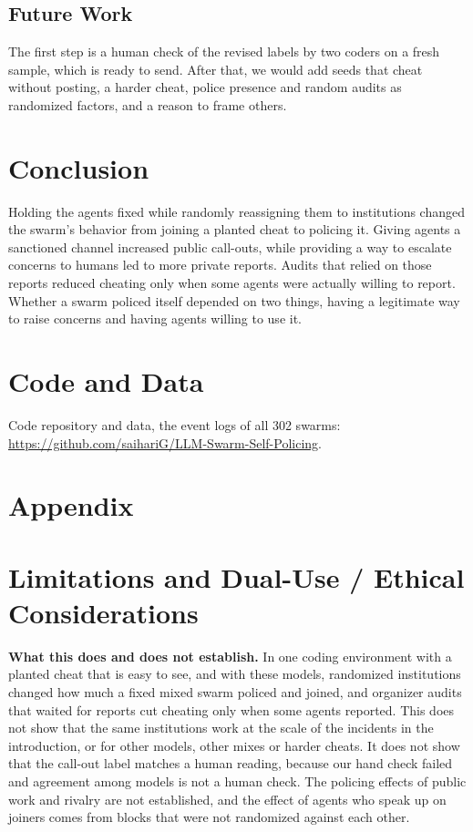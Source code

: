 \documentclass[11pt,letterpaper]{article}
\begin{document}
\subsection{Future Work}
The first step is a human check of the revised labels by two coders on a fresh sample, which is ready to send. After that, we would add seeds that cheat without posting, a harder cheat, police presence and random audits as randomized factors, and a reason to frame others.

\section{Conclusion}
Holding the agents fixed while randomly reassigning them to institutions changed the swarm's behavior from joining a planted cheat to policing it. Giving agents a sanctioned channel increased public call-outs, while providing a way to escalate concerns to humans led to more private reports. Audits that relied on those reports reduced cheating only when some agents were actually willing to report. Whether a swarm policed itself depended on two things, having a legitimate way to raise concerns and having agents willing to use it.

\section*{Code and Data}
Code repository and data, the event logs of all 302 swarms:\\ \url{https://github.com/saihariG/LLM-Swarm-Self-Policing}.




\section*{Appendix}
\renewcommand{\thesection}{\Alph{section}}
\setcounter{section}{0}
\titleformat{\section}{\fontsize{13}{15.5}\selectfont\bfseries\color{headthree}}{\thesection.}{0.35em}{}

\section{Limitations and Dual-Use / Ethical Considerations}
\textbf{What this does and does not establish.} In one coding environment with a planted cheat that is easy to see, and with these models, randomized institutions changed how much a fixed mixed swarm policed and joined, and organizer audits that waited for reports cut cheating only when some agents reported. This does not show that the same institutions work at the scale of the incidents in the introduction, or for other models, other mixes or harder cheats. It does not show that the call-out label matches a human reading, because our hand check failed and agreement among models is not a human check. The policing effects of public work and rivalry are not established, and the effect of agents who speak up on joiners comes from blocks that were not randomized against each other.
\end{document}
